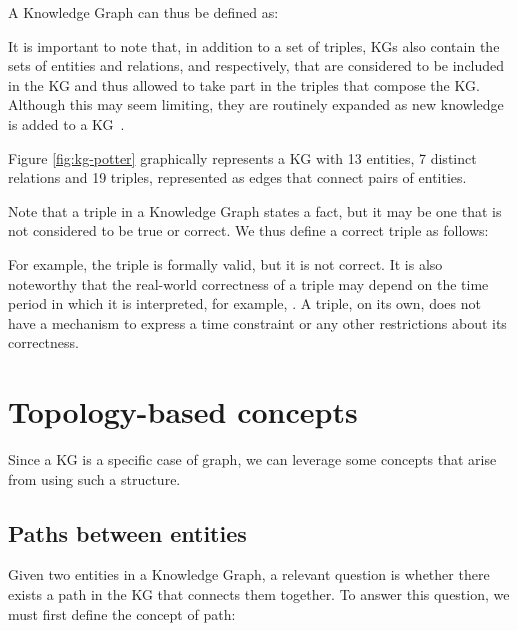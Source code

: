 A Knowledge Graph can thus be defined as:


It is important to note that, in addition to a set of triples, KGs also contain the sets of entities and relations, \Eset{} and \Rset{} respectively, that are considered to be included in the KG and thus allowed to take part in the triples that compose the KG. Although this may seem limiting, they are routinely expanded as new knowledge is added to a KG~\cite{dong2014}.

Figure \ref{fig:kg-potter} graphically represents a KG with 13 entities, 7 distinct relations and 19 triples, represented as edges that connect pairs of entities.

Note that a triple in a Knowledge Graph states a fact, but it may be one that is not considered to be true or correct. We thus define a correct triple as follows:


For example, the triple  is formally valid, but it is not correct. It is also noteworthy that the real-world correctness of a triple may depend on the time period in which it is interpreted, for example, . A triple, on its own, does not have a mechanism to express a time constraint or any other restrictions about its correctness.

\section{Topology-based concepts}\label{sec:theo-paths}
Since a KG is a specific case of graph, we can leverage some concepts that arise from using such a structure. 

\subsection{Paths between entities}
Given two entities in a Knowledge Graph, a relevant question is whether there exists a path in the KG that connects them together. To answer this question, we must first define the concept of path:

